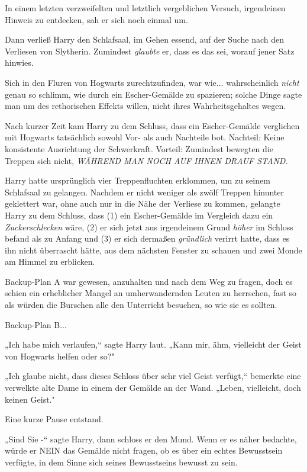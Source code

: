 {In einem letzten verzweifelten und letztlich vergeblichen Versuch, irgendeinen Hinweis zu entdecken, sah er sich noch einmal um.

Dann verließ Harry den Schlafsaal, im Gehen essend, auf der Suche nach den Verliesen von Slytherin. Zumindest \emph{glaubte} er, dass es das sei, worauf jener Satz hinwies.

Sich in den Fluren von Hogwarts zurechtzufinden, war wie... wahrscheinlich \emph{nicht} genau so schlimm, wie durch ein Escher-Gemälde zu spazieren; solche Dinge sagte man um des rethorischen Effekts willen, nicht ihres Wahrheitsgehaltes wegen.

Nach kurzer Zeit kam Harry zu dem Schluss, dass ein Escher-Gemälde verglichen mit Hogwarts tatsächlich sowohl Vor- als auch Nachteile bot. Nachteil: Keine konsistente Ausrichtung der Schwerkraft. Vorteil: Zumindest bewegten die Treppen sich nicht, \emph{WÄHREND MAN NOCH AUF IHNEN DRAUF STAND.}

Harry hatte ursprünglich vier Treppenfluchten erklommen, um zu seinem Schlafsaal zu gelangen. Nachdem er nicht weniger als zwölf Treppen hinunter geklettert war, ohne auch nur in die Nähe der Verliese zu kommen, gelangte Harry zu dem Schluss, dass (1) ein Escher-Gemälde im Vergleich dazu ein \emph{Zuckerschlecken} wäre, (2) er sich jetzt aus irgendeinem Grund \emph{höher} im Schloss befand als zu Anfang und (3) er sich dermaßen \emph{gründlich} verirrt hatte, dass es ihn nicht überrascht hätte, aus dem nächsten Fenster zu schauen und zwei Monde am Himmel zu erblicken.

Backup-Plan A war gewesen, anzuhalten und nach dem Weg zu fragen, doch es schien ein erheblicher Mangel an umherwandernden Leuten zu herrschen, fast so als würden die Burschen alle den Unterricht besuchen, so wie sie es sollten.

Backup-Plan B...

„Ich habe mich verlaufen,“ sagte Harry laut. „Kann mir, ähm, vielleicht der Geist von Hogwarts helfen oder so?"

„Ich glaube nicht, dass dieses Schloss über sehr viel Geist verfügt,“ bemerkte eine verwelkte alte Dame in einem der Gemälde an der Wand. „Leben, vielleicht, doch keinen Geist."

Eine kurze Pause entstand.

„Sind Sie -“ sagte Harry, dann schloss er den Mund. Wenn er es näher bedachte, würde er NEIN das Gemälde nicht fragen, ob es über ein echtes Bewusstsein verfügte, in dem Sinne sich seines Bewusstseins bewusst zu sein.

}
